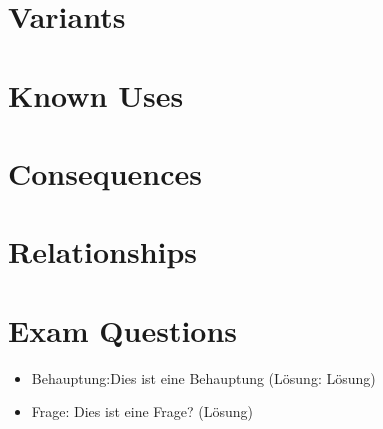\section{Variants}


\section{Known Uses}


\section{Consequences}


\section{Relationships}


\section{Exam Questions}
\begin{itemize}
  	\item Behauptung:Dies ist eine Behauptung (Lösung: Lösung)
    \item Frage: Dies ist eine Frage? (Lösung)
\end{itemize}

